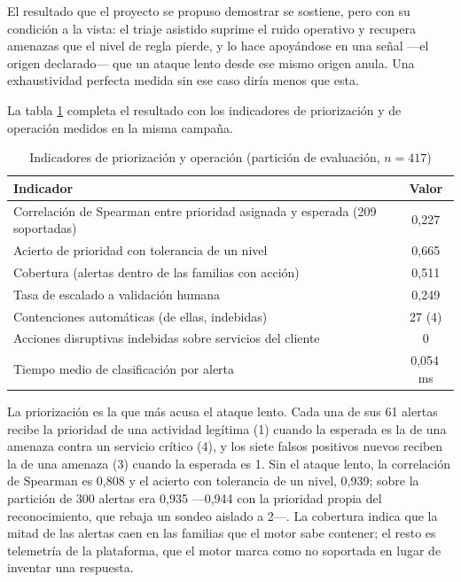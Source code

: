El resultado que el proyecto se propuso demostrar se sostiene, pero con su condición a la vista:
el triaje asistido suprime el ruido operativo y recupera amenazas que el nivel de regla pierde, y lo
hace apoyándose en una señal ---el origen declarado--- que un ataque lento desde ese mismo origen
anula. Una exhaustividad perfecta medida sin ese caso diría menos que esta.

La tabla \ref{tab:indicadores} completa el resultado con los indicadores de priorización y de
operación medidos en la misma campaña.

\begin{table}[H]
  \centering
  \caption{Indicadores de priorización y operación (partición de evaluación, $n=417$)}
  \label{tab:indicadores}
  \begin{tabular}{@{}p{}c@{}}
    \toprule
    \textbf{Indicador} & \textbf{Valor} \\
    \midrule
    Correlación de Spearman entre prioridad asignada y esperada (209 soportadas) & 0,227 \\
    Acierto de prioridad con tolerancia de un nivel & 0,665 \\
    Cobertura (alertas dentro de las familias con acción) & 0,511 \\
    Tasa de escalado a validación humana & 0,249 \\
    Contenciones automáticas (de ellas, indebidas) & 27 (4) \\
    Acciones disruptivas indebidas sobre servicios del cliente & 0 \\
    Tiempo medio de clasificación por alerta & 0,054\,ms \\
    \bottomrule
  \end{tabular}
\end{table}

La priorización es la que más acusa el ataque lento. Cada una de sus 61 alertas recibe la prioridad
de una actividad legítima (1) cuando la esperada es la de una amenaza contra un servicio crítico
(4), y los siete falsos positivos nuevos reciben la de una amenaza (3) cuando la esperada es 1. Sin
el ataque lento, la correlación de Spearman \cite{spearman1904} es 0,808 y el acierto con tolerancia
de un nivel, 0,939; sobre la partición de 300 alertas era 0,935 ---0,944 con la prioridad propia del
reconocimiento, que rebaja un sondeo aislado a 2---. La cobertura indica que la mitad de las alertas
caen en las familias que el motor sabe contener; el resto es telemetría de la plataforma, que el
motor marca como no soportada en lugar de inventar una respuesta.

